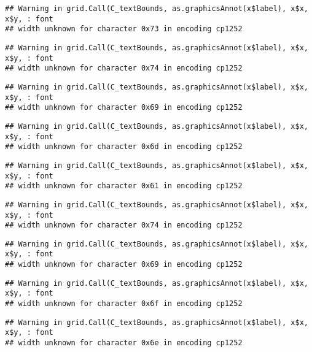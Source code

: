 \documentclass[
]{article}
\begin{document}
\begin{verbatim}
## Warning in grid.Call(C_textBounds, as.graphicsAnnot(x$label), x$x, x$y, : font
## width unknown for character 0x73 in encoding cp1252
\end{verbatim}

\begin{verbatim}
## Warning in grid.Call(C_textBounds, as.graphicsAnnot(x$label), x$x, x$y, : font
## width unknown for character 0x74 in encoding cp1252
\end{verbatim}

\begin{verbatim}
## Warning in grid.Call(C_textBounds, as.graphicsAnnot(x$label), x$x, x$y, : font
## width unknown for character 0x69 in encoding cp1252
\end{verbatim}

\begin{verbatim}
## Warning in grid.Call(C_textBounds, as.graphicsAnnot(x$label), x$x, x$y, : font
## width unknown for character 0x6d in encoding cp1252
\end{verbatim}

\begin{verbatim}
## Warning in grid.Call(C_textBounds, as.graphicsAnnot(x$label), x$x, x$y, : font
## width unknown for character 0x61 in encoding cp1252
\end{verbatim}

\begin{verbatim}
## Warning in grid.Call(C_textBounds, as.graphicsAnnot(x$label), x$x, x$y, : font
## width unknown for character 0x74 in encoding cp1252
\end{verbatim}

\begin{verbatim}
## Warning in grid.Call(C_textBounds, as.graphicsAnnot(x$label), x$x, x$y, : font
## width unknown for character 0x69 in encoding cp1252
\end{verbatim}

\begin{verbatim}
## Warning in grid.Call(C_textBounds, as.graphicsAnnot(x$label), x$x, x$y, : font
## width unknown for character 0x6f in encoding cp1252
\end{verbatim}

\begin{verbatim}
## Warning in grid.Call(C_textBounds, as.graphicsAnnot(x$label), x$x, x$y, : font
## width unknown for character 0x6e in encoding cp1252
\end{verbatim}
\end{document}
